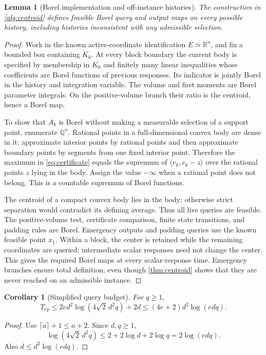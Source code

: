 \documentclass[11pt]{article}
\numberwithin{equation}{section}
\newtheorem{lemma}[lemma]{Lemma}
\newtheorem{corollary}[corollary]{Corollary}
\theoremstyle{definition}
\theoremstyle{remark}
\newcommand{\R}{\mathbb R}
\newcommand{\ip}[2]{\langle #1,#2\rangle}
\begin{document}
\begin{lemma}[Borel implementation and off-instance histories]\label{lem:cp-borel}
The construction in \cref{alg:centroid} defines feasible Borel query and output maps on every possible history, including histories inconsistent with any admissible selection.
\end{lemma}
\begin{proof}
Work in the known active-coordinate identification $E\simeq\R^n$, and fix a bounded box containing $K_0$. At every block boundary the current body is specified by membership in $K_0$ and finitely many linear inequalities whose coefficients are Borel functions of previous responses. Its indicator is jointly Borel in the history and integration variable. The volume and first moments are Borel parameter integrals. On the positive-volume branch their ratio is the centroid, hence a Borel map.

To show that $A_k$ is Borel without making a measurable selection of a support point, enumerate $\mathbb Q^n$. Rational points in a full-dimensional convex body are dense in it: approximate interior points by rational points and then approximate boundary points by segments from one fixed interior point. Therefore the maximum in \eqref{eq:certificate} equals the supremum of $\ip{v_k}{c_k-z}$ over the rational points $z$ lying in the body. Assign the value $-\infty$ when a rational point does not belong. This is a countable supremum of Borel functions.

The centroid of a compact convex body lies in the body; otherwise strict separation would contradict its defining average. Thus all live queries are feasible. The positive-volume test, certificate comparison, finite state transitions, and padding rules are Borel. Emergency outputs and padding queries use the known feasible point $x_1$. Within a block, the center is retained while the remaining coordinates are queried; intermediate scalar responses need not change the center. This gives the required Borel maps at every scalar-response time. Emergency branches ensure total definition, even though \cref{thm:centroid} shows that they are never reached on an admissible instance.
\end{proof}

\begin{corollary}[Simplified query budget]\label{cor:cp-log}
For $q\ge1$,
\begin{equation}\label{eq:cp-simple}
T_{\mathrm{cp}}
\le 2ed^2\log(4\sqrt2\,d^2q)+2d
\le(4e+2)d^2\log(edq).
\end{equation}
\end{corollary}
\begin{proof}
Use $\lceil a\rceil+1\le a+2$. Since $d,q\ge1$,
\[
\log(4\sqrt2\,d^2q)
\le2+2\log d+2\log q=2\log(edq).
\]
Also $d\le d^2\log(edq)$.
\end{proof}
\end{document}
